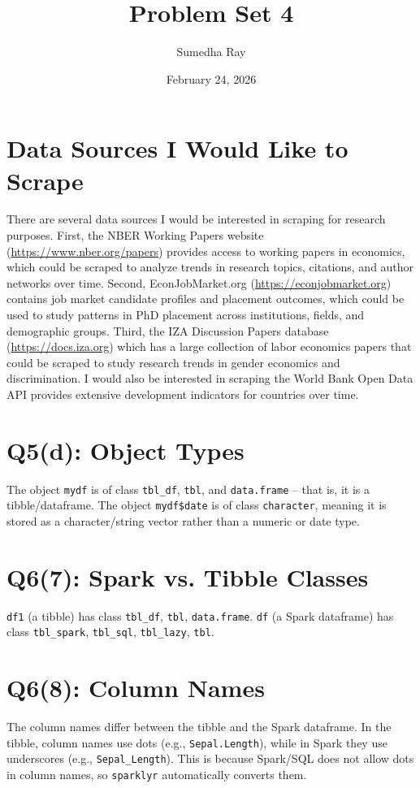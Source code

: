 \documentclass{article}
\title{Problem Set 4}
\author{Sumedha Ray}
\date{February 24, 2026}
\begin{document}
\maketitle

\section*{Data Sources I Would Like to Scrape}

There are several data sources I would be interested in scraping for research purposes.
First, the NBER Working Papers website (\url{https://www.nber.org/papers}) provides 
access to working papers in economics, which could be scraped to analyze 
trends in research topics, citations, and author networks over time. Second, 
EconJobMarket.org (\url{https://econjobmarket.org}) contains job market candidate 
profiles and placement outcomes, which could be used to study patterns in PhD placement 
across institutions, fields, and demographic groups. Third, the IZA Discussion Papers 
database (\url{https://docs.iza.org}) which has a large collection of labor economics 
papers that could be scraped to study research trends in gender economics and 
discrimination. 
I would also be interested in scraping the World Bank Open Data API provides extensive development indicators for countries over time. 


\section*{Q5(d): Object Types}
The object \texttt{mydf} is of class \texttt{tbl\_df}, \texttt{tbl}, and 
\texttt{data.frame} -- that is, it is a tibble/dataframe. The object 
\texttt{mydf\$date} is of class \texttt{character}, meaning it is stored as 
a character/string vector rather than a numeric or date type.

\section*{Q6(7): Spark vs. Tibble Classes}
\texttt{df1} (a tibble) has class \texttt{tbl\_df}, \texttt{tbl}, \texttt{data.frame}.
\texttt{df} (a Spark dataframe) has class \texttt{tbl\_spark}, \texttt{tbl\_sql}, 
\texttt{tbl\_lazy}, \texttt{tbl}.

\section*{Q6(8): Column Names}
The column names differ between the tibble and the Spark dataframe. In the tibble,
column names use dots (e.g., \texttt{Sepal.Length}), while in Spark they use 
underscores (e.g., \texttt{Sepal\_Length}). This is because Spark/SQL does not 
allow dots in column names, so \texttt{sparklyr} automatically converts them.
\end{document}
